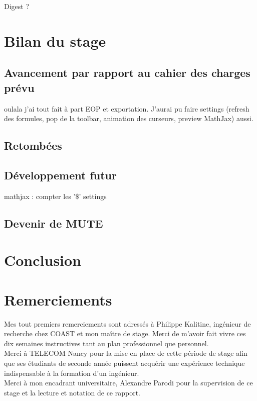 \documentclass[12pt]{article}
\begin{document}
Digest ?

\newpage
\section{Bilan du stage}
\subsection{Avancement par rapport au cahier des charges prévu}
oulala j'ai tout fait à part EOP et exportation. J'aurai pu faire settings (refresh des formules, pop de la toolbar, animation des curseurs, preview MathJax) aussi.

\subsection{Retombées}

\subsection{Développement futur}
mathjax : compter les '\$'
settings

\subsection{Devenir de MUTE}

\newpage
{}
\section*{Conclusion}

\newpage
{}
\section*{Remerciements}
Mes tout premiers remerciements sont adressés à Philippe Kalitine, ingénieur de recherche chez COAST et mon maître de stage. Merci de m'avoir fait vivre ces dix semaines instructives tant au plan professionnel que personnel.\\

Merci à TELECOM Nancy pour la mise en place de cette période de stage afin que ses étudiants de seconde année puissent acquérir une expérience technique indispensable à la formation d'un ingénieur.\\

Merci à mon encadrant universitaire, Alexandre Parodi pour la supervision de ce stage et la lecture et notation de ce rapport.\\
\end{document}
